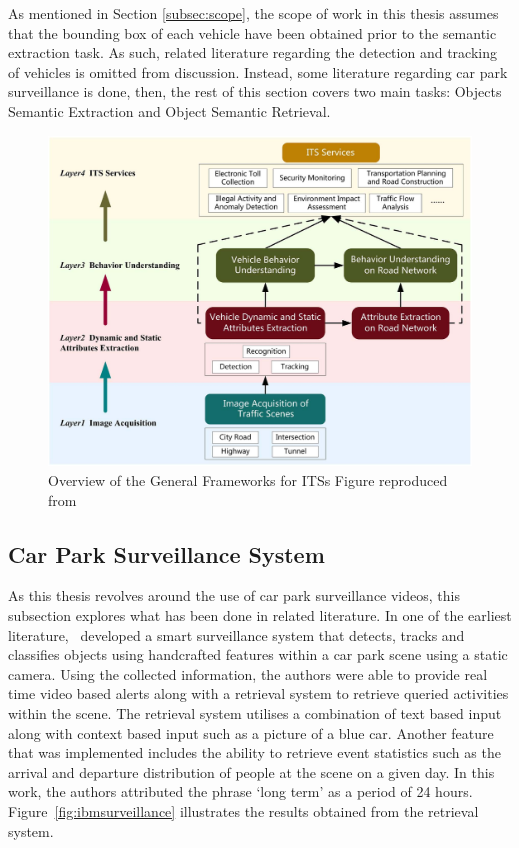 As mentioned in Section \ref{subsec:scope}, the scope of work in this thesis assumes that the
bounding box of each vehicle have been obtained prior to the semantic
extraction task. As such, related literature regarding the detection and tracking of
vehicles is omitted from discussion. Instead, some literature regarding car park surveillance is done, then, the rest of this section covers two main tasks: Objects Semantic Extraction and Object Semantic Retrieval.

\begin{figure}[hbt!]\centering
 \includegraphics[width=1\textwidth]{image/lit/ITS.png}
 \caption[Overview of the General Frameworks for ITSs]{Overview of the General Frameworks for ITSs 
 Figure reproduced
 from~}
 \label{fig:ITSoverview}
\end{figure}

\subsection{Car Park Surveillance System}
As this thesis revolves around the use of car park surveillance videos, this subsection explores what has been done in related literature. In one of the earliest literature,~ developed a smart surveillance system that detects, tracks and classifies objects using handcrafted features within a car park scene using a static camera. Using the collected information, the authors were able to provide real time video based alerts along with a retrieval system to retrieve queried activities within the scene. The retrieval system utilises a combination of text based input along with context based input such as a picture of a blue car. Another feature that was implemented includes the ability to retrieve event statistics such as the arrival and departure distribution of people at the scene on a given day. In this work, the authors attributed the phrase `long term' as a period of 24 hours. Figure~\ref{fig:ibmsurveillance} illustrates the results obtained from the retrieval system.

